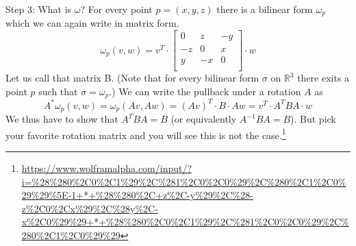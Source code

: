 \documentclass[a4paper,11pt,notitlepage,fullpage]{article}
\begin{document}
\begin{enumerate}
Step 3: What is $\omega$? For every point $p = (x,y,z)$ there is a bilinear form $\omega_p$ which we can again write in matrix form.
\begin{equation*}
\omega_p(v, w) = v^T \cdot
\left[ {\begin{array}{rrr}
   0 & z &-y \\
  -z & 0 & x \\
   y &-x & 0 \\
\end{array} } \right] \cdot w
\end{equation*}
Let us call that matrix B. (Note that for every bilinear form $\sigma$ on $\mathbb R^3$ there exits a point $p$ such that $\sigma = \omega_p$.) We can write the pullback under a rotation $A$ as
\begin{equation*}
A^*\omega_p(v, w) = \omega_p(Av, Aw) = (Av)^T \cdot B \cdot Aw = v^T \cdot A^T B A \cdot w
\end{equation*}
We thus have to show that $A^T B A = B$ (or equivalently $A^{-1} B A = B$). But pick your favorite rotation matrix and you will see this is not the case.\footnote{\url{https://www.wolframalpha.com/input/?i=\%28\%280\%2C0\%2C1\%29\%2C\%281\%2C0\%2C0\%29\%2C\%280\%2C1\%2C0\%29\%29\%5E-1+*+\%28\%280\%2C+z\%2C-y\%29\%2C\%28-z\%2C0\%2Cx\%29\%2C\%28y\%2C-x\%2C0\%29\%29+*+\%28\%280\%2C0\%2C1\%29\%2C\%281\%2C0\%2C0\%29\%2C\%280\%2C1\%2C0\%29\%29}}


\end{enumerate}
\end{document}
